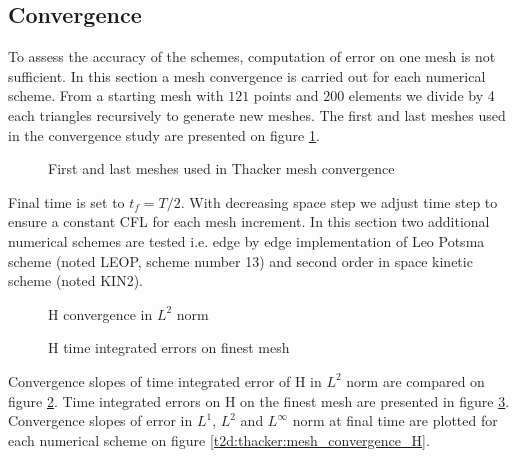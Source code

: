\subsection{Convergence}

To assess the accuracy of the schemes, computation of error on one mesh is not sufficient.
In this section a mesh convergence is carried out for each numerical scheme. From a starting mesh
with $121$ points and $200$ elements we divide by 4 each triangles recursively to generate new meshes.
The first and last meshes used in the convergence study are presented on figure \ref{t2d:cone:meshes}.

\begin{figure}[h!]
\begin{minipage}[t]{0.5\textwidth}
 \centering
\end{minipage}%
\begin{minipage}[t]{0.5\textwidth}
 \centering
\end{minipage}
 \caption{First and last meshes used in Thacker mesh convergence}
 \label{t2d:cone:meshes}
\end{figure}

Final time is set to $t_f=T/2$.
With decreasing space step we adjust time step to ensure a constant CFL for each mesh increment.
In this section two additional numerical schemes are tested
i.e. edge by edge implementation of Leo Potsma scheme (noted LEOP, scheme number 13)
and second order in space kinetic scheme (noted KIN2).

\begin{figure}[H]
\centering
  \caption{H convergence in $L^2$ norm}
\label{fig:thacker:ErrNumH_convergence}
\end{figure}

\begin{figure}[H]
\centering
  \caption{H time integrated errors on finest mesh}
\label{fig:thacker:ErrNumH_convergence_mesh3}
\end{figure}

Convergence slopes of time integrated error of H in $L^2$ norm are compared on figure \ref{fig:thacker:ErrNumH_convergence}.
Time integrated errors on H on the finest mesh are presented in figure \ref{fig:thacker:ErrNumH_convergence_mesh3}.
Convergence slopes of error in $L^1$, $L^2$ and $L^\infty$ norm at final time
are plotted for each numerical scheme on figure \ref{t2d:thacker:mesh_convergence_H}.


